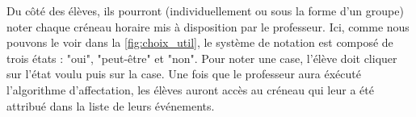 \documentclass[french]{article}
\begin{document}
    Du côté des élèves, ils pourront (individuellement ou sous la forme d'un groupe) noter chaque créneau horaire mis à disposition par le professeur. Ici, comme nous pouvons le voir dans la \autoref{fig:choix_util}, le système de notation est composé de trois états : "oui", "peut-être" et "non". Pour noter une case, l'élève doit cliquer sur l'état voulu puis sur la case. Une fois que le professeur aura éxécuté l'algorithme d'affectation, les élèves auront accès au créneau qui leur a été attribué dans la liste de leurs événements.
    \\

\end{document}
